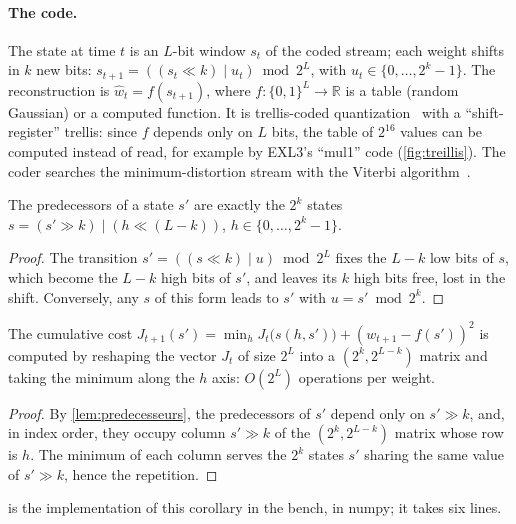 \paragraph{The code.} The state at time $t$ is an $L$-bit window $s_t$ of the coded stream; each weight shifts in $k$ new bits: $s_{t+1} = ((s_t \ll k) \mid u_t) \bmod 2^L$, with $u_t \in \{0, \dots, 2^k - 1\}$. The reconstruction is $\hat w_t = f(s_{t+1})$, where $f : \{0,1\}^L \to \mathbb R$ is a table (random Gaussian) or a computed function. It is trellis-coded quantization~\cite{marcellin1990} with a \enquote{shift-register} trellis: since $f$ depends only on $L$ bits, the table of $2^{16}$ values can be computed instead of read, for example by EXL3's \enquote{mul1} code (\cref{fig:treillis}). The coder searches the minimum-distortion stream with the Viterbi algorithm~\cite{viterbi1967}.

\begin{lemme}\label{lem:predecesseurs}
The predecessors of a state $s'$ are exactly the $2^k$ states $s = (s' \gg k) \mid (h \ll (L-k))$, $h \in \{0, \dots, 2^k - 1\}$.
\end{lemme}

\begin{proof}
The transition $s' = ((s \ll k) \mid u) \bmod 2^L$ fixes the $L - k$ low bits of $s$, which become the $L-k$ high bits of $s'$, and leaves its $k$ high bits free, lost in the shift. Conversely, any $s$ of this form leads to $s'$ with $u = s' \bmod 2^k$.
\end{proof}

\begin{corollaire}\label{cor:viterbi}
The cumulative cost $J_{t+1}(s') = \min_h J_t\bigl(s(h, s')\bigr) + (w_{t+1} - f(s'))^2$ is computed by reshaping the vector $J_t$ of size $2^L$ into a $(2^k, 2^{L-k})$ matrix and taking the minimum along the $h$ axis: $O(2^L)$ operations per weight.
\end{corollaire}

\begin{proof}
By \cref{lem:predecesseurs}, the predecessors of $s'$ depend only on $s' \gg k$, and, in index order, they occupy column $s' \gg k$ of the $(2^k, 2^{L-k})$ matrix whose row is $h$. The minimum of each column serves the $2^k$ states $s'$ sharing the same value of $s' \gg k$, hence the repetition.
\end{proof}

 is the implementation of this corollary in the bench, in numpy; it takes six lines.

